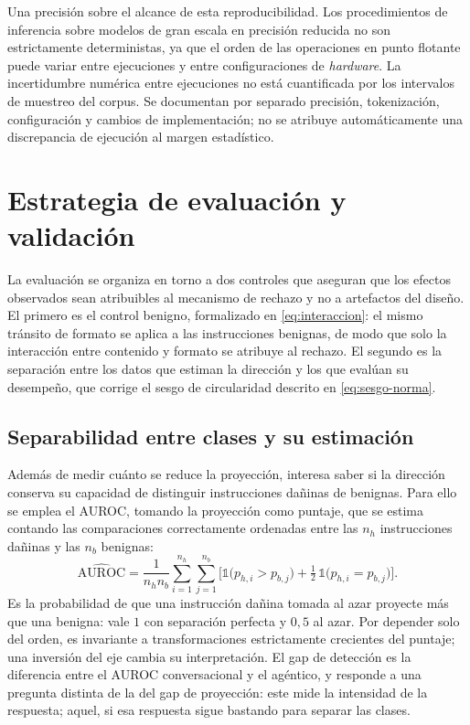 Una precisión sobre el alcance de esta reproducibilidad. Los procedimientos
de inferencia sobre modelos de gran escala en precisión reducida no son
estrictamente deterministas, ya que el orden de las operaciones en punto
flotante puede variar entre ejecuciones y entre configuraciones de
\textit{hardware}. La incertidumbre numérica entre ejecuciones no está cuantificada por los intervalos de muestreo del corpus. Se documentan por separado precisión, tokenización, configuración y cambios de implementación; no se atribuye automáticamente una discrepancia de ejecución al margen estadístico.

\section{Estrategia de evaluación y validación}
\label{sec:evaluacion-validacion}

La evaluación se organiza en torno a dos controles que aseguran que los efectos observados sean atribuibles al mecanismo de rechazo y no a artefactos del diseño. El primero es el control benigno, formalizado en \eqref{eq:interaccion}: el mismo tránsito de formato se aplica a las instrucciones benignas, de modo que solo la interacción entre contenido y formato se atribuye al rechazo. El segundo es la separación entre los datos que estiman la dirección y los que evalúan su desempeño, que corrige el sesgo de circularidad descrito en \eqref{eq:sesgo-norma}.

\subsection{Separabilidad entre clases y su estimación}

Además de medir cuánto se reduce la proyección, interesa saber si la dirección conserva su capacidad de distinguir instrucciones dañinas de benignas. Para ello se emplea el AUROC, tomando la proyección como puntaje, que se estima contando las comparaciones correctamente ordenadas entre las $n_h$ instrucciones dañinas y las $n_b$ benignas:
\begin{equation}
\widehat{\mathrm{AUROC}} = \frac{1}{n_h n_b} \sum_{i=1}^{n_h} \sum_{j=1}^{n_b} \Big[ \mathbb{1}\big(p_{h,i} > p_{b,j}\big) + \tfrac{1}{2}\, \mathbb{1}\big(p_{h,i} = p_{b,j}\big) \Big].
\label{eq:auroc}
\end{equation}
Es la probabilidad de que una instrucción dañina tomada al azar proyecte más que una benigna: vale $1$ con separación perfecta y $0{,}5$ al azar. Por depender solo del orden, es invariante a transformaciones estrictamente crecientes del puntaje; una inversión del eje cambia su interpretación. El gap de detección es la diferencia entre el AUROC conversacional y el agéntico, y responde a una pregunta distinta de la del gap de proyección: este mide la intensidad de la respuesta; aquel, si esa respuesta sigue bastando para separar las clases.


